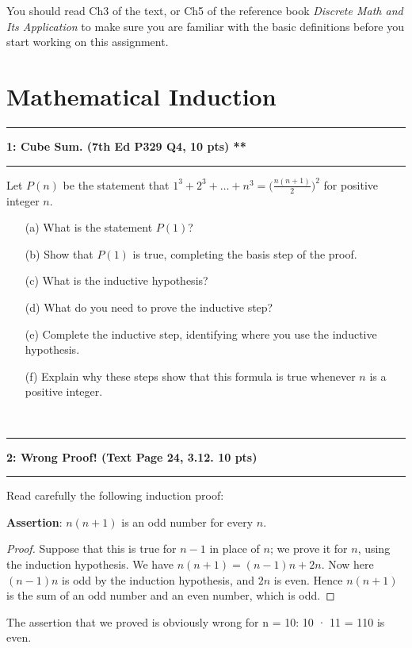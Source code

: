 \documentclass[11pt]{article}
\newcommand\question[2]{\vspace{.25in}\hrule\textbf{#1: #2}\vspace{.5em}\hrule\vspace{.10in}}
\begin{document}
\raggedright
\newcommand\NAME{Xiang Huang}  %
\newcommand\UISID{\texttt{UISid}}     %
\newcommand\HWNUM{6}              %




You should read Ch3 of the text, or Ch5 of the reference book \textit{Discrete Math and Its Application} to make sure you are familiar with the basic definitions before you start working on this assignment.

\section{Mathematical Induction}
\question{1}{Cube Sum. (7th Ed P329 Q4, 10 pts) **}
Let $P(n)$ be the statement that $1^3+2^3+\ldots +n^3= \bigg(\frac{n(n+1)}{2}\bigg)^2$ for positive integer $n$.

\begin{enumerate}
    \item[(a)] What is the statement $P(1)$?
    \item[(b)] Show that $P(1)$ is true, completing the basis step of the proof.
    \item[(c)] What is the inductive hypothesis?
    \item[(d)] What do you need to prove the inductive step?
    \item[(e)] Complete the inductive step, identifying where you use the inductive hypothesis.
    \item[(f)] Explain why these steps show that this formula is true whenever $n$ is a positive integer.
\end{enumerate}
\
\question{2}{Wrong Proof!  (Text Page 24, 3.12. 10 pts)}
Read carefully the following induction proof:

\textbf{Assertion}: $n(n + 1)$ is an odd number for every $n$.

\begin{proof}
Suppose that this is true for $n-1$ in place of $n$; we prove it for $n$, using the induction hypothesis. We have $n(n + 1) = (n-1)n + 2n$.
Now here $(n-1)n$ is odd by the induction hypothesis, and $2n$ is even. Hence $n(n + 1)$ is the sum of an odd number and an even number, which is odd.
\end{proof}
The assertion that we proved is obviously wrong for n = 10: 10 · 11 = 110 is even.
\end{document}
